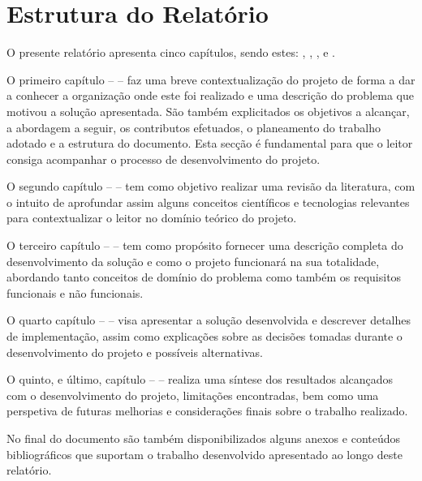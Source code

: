 \section{Estrutura do Relatório}

O presente relatório apresenta cinco capítulos, sendo estes: ,
, ,  e
.

O primeiro capítulo –  – faz uma breve contextualização do projeto de
forma a dar a conhecer a organização onde este foi realizado e uma descrição do problema que motivou
a solução apresentada. São também explicitados os objetivos a alcançar, a abordagem a seguir, os
contributos efetuados, o planeamento do trabalho adotado e a estrutura do documento. Esta secção é 
fundamental para que o leitor consiga acompanhar o processo de desenvolvimento do projeto.

O segundo capítulo –  – tem como objetivo realizar uma revisão da
literatura, com o intuito de aprofundar assim alguns conceitos científicos e tecnologias relevantes 
para contextualizar o leitor no domínio teórico do projeto.  

O terceiro capítulo –  – tem como propósito fornecer uma descrição completa 
do desenvolvimento da solução e como o projeto funcionará na sua totalidade, abordando tanto conceitos
de domínio do problema como também os requisitos funcionais e não funcionais.

O quarto capítulo –  – visa apresentar a solução desenvolvida e 
descrever detalhes de implementação, assim como explicações sobre as decisões tomadas durante o
desenvolvimento do projeto e possíveis alternativas.

O quinto, e último, capítulo –  – realiza uma síntese dos resultados 
alcançados com o desenvolvimento do projeto, limitações encontradas, bem como uma perspetiva de 
futuras melhorias e considerações finais sobre o trabalho realizado.

No final do documento são também disponibilizados alguns anexos e conteúdos bibliográficos que 
suportam o trabalho desenvolvido apresentado ao longo deste relatório.
